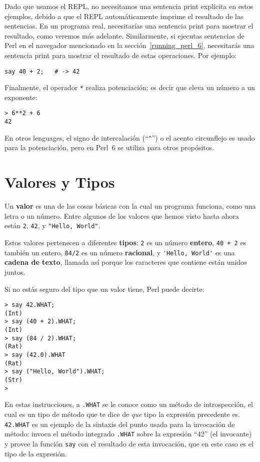 Dado que usamos el REPL, no necesitamos una sentencia print explícita
en estos ejemplos, debido a que el REPL automáticamente imprime el resultado de las sentencias. En un programa real, necesitarías una sentencia print para mostrar el resultado, como veremos más adelante. Similarmente, si ejecutas sentencias de Perl en el navegador mencionado en la sección~\ref{running_perl_6}, necesitarás una sentencia print para mostrar el resultado de estas operaciones.
Por ejemplo:

\begin{lstlisting}
say 40 + 2;   # -> 42
\end{lstlisting}


Finalmente, el operador {\tt **} realiza potenciación; es decir que eleva un número a un exponente:

\begin{lstlisting}
> 6**2 + 6
42
\end{lstlisting}
%
En otros lenguages, el signo de intercalación (``\verb"^"'') o el acento circunflejo es usado para la potenciación, pero en Perl~6 se utiliza para otros propósitos.
%


\section{Valores y Tipos}
\label{values_and_types}

Un {\bf valor} es una de las cosas básicas con la cual un programa funciona,
como una letra o un número. Entre algunos de los valores que hemos visto hasta ahora
están {\tt 2}, {\tt 42}, y \verb'"Hello, World"'.

Estos valores pertenecen a diferentes {\bf tipos}: 
{\tt 2} es un número {\bf entero}, {\tt 40 + 2} es también un entero, 
{\tt 84/2} es un número {\bf racional}, y  \verb"'Hello, World'" es una
{\bf cadena de texto}, llamada así porque los caracteres que contiene están
unidos juntos.

Si no estás seguro del tipo que un valor tiene, Perl puede decirte:

\begin{lstlisting}
> say 42.WHAT;
(Int)
> say (40 + 2).WHAT;
(Int)
> say (84 / 2).WHAT;
(Rat)
> say (42.0).WHAT
(Rat)
> say ("Hello, World").WHAT;
(Str)
>
\end{lstlisting}
%
En estas instrucciones, a {\tt .WHAT} se le conoce como un método 
de introspección, el cual es un tipo de método que te dice de \emph{que}
tipo la expresión precedente es. {\tt 42.WHAT} es un ejemplo de la sintaxis 
del punto usada para la invocación de método: invoca el método integrado
{\tt .WHAT} sobre la expresión ``42'' (el invocante) y provee la función {\tt say}
con el resultado de esta invocación, que en este caso es el tipo de la expresión.

